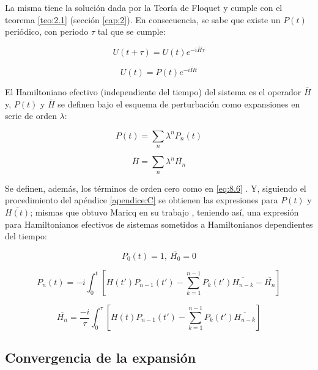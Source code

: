 La misma tiene la solución dada por la Teoría de Floquet y cumple con el teorema \ref{teo:2.1} (sección \ref{cap:2}). En consecuencia, se sabe que existe un $P(t)$ periódico, con periodo $\tau$ tal que se cumple:

\begin{equation}\label{eq:8.2}
    U(t+\tau)=U(t)e^{-i\overline{H}\tau}
\end{equation}

\begin{equation}\label{eq:8.3}
    U(t)=P(t)e^{-i\overline{H}t}
\end{equation}

El Hamiltoniano efectivo (independiente del tiempo) del sistema es el operador $\overline{H}$ y, $P(t)$ y $\overline{H}$ se definen bajo el esquema de perturbación \cite{maricq} como expansiones en serie de orden $\lambda$:

\begin{equation}\label{eq:8.4}
    P(t)=\sum_n \lambda^{n}P_n(t)
\end{equation}

\begin{equation}\label{eq:8.5}
    \overline{H}=\sum_n \lambda^n\overline{H_n}
\end{equation}

Se definen, además, los términos de orden cero  como en \ref{eq:8.6} \cite{maricq}\cite{martinez2017}. Y, siguiendo el procedimiento del apéndice \ref{apendice:C} se obtienen las expresiones para $P(t)$ y $\overline{H(t)}$; mismas que obtuvo Maricq en su trabajo \cite{maricq}, teniendo así, una expresión para Hamiltonianos efectivos de sistemas sometidos a Hamiltonianos dependientes del tiempo: 

\begin{equation}\label{eq:8.6}
    P_0(t)=1, \ \overline{H_0}=0
\end{equation}

\begin{equation}\label{eq:8.7}
    P_n(t)=-i\int^{t}_{0}\left[ H(t')P_{n-1}(t')-\sum^{n-1}_{k=1}P_k(t')\overline{H_{n-k}}-\overline{H_n}\right]
\end{equation}

\begin{equation}\label{eq:8.8}
    \overline{H_n}=\frac{-i}{\tau}\int^{\tau}_{0}\left[ H(t)P_{n-1}(t')-\sum^{n-1}_{k=1}P_k(t')\overline{H_{n-k}}\right]
\end{equation}

\subsection{Convergencia de la expansión}\label{cap:8.2}

